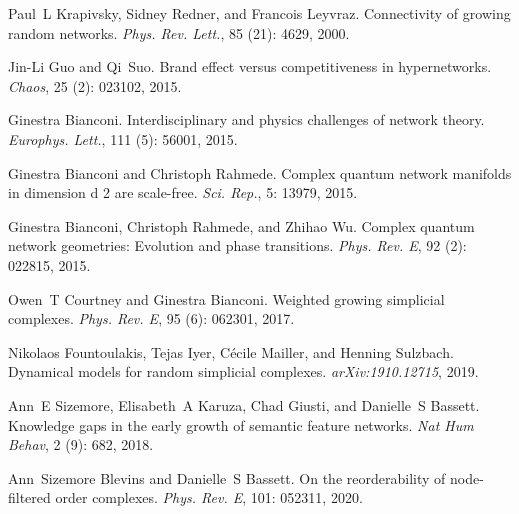 Paul~L Krapivsky, Sidney Redner, and Francois Leyvraz.
\newblock Connectivity of growing random networks.
\newblock \emph{Phys. Rev. Lett.}, 85 (21): 4629, 2000.

Jin-Li Guo and Qi~Suo.
\newblock Brand effect versus competitiveness in hypernetworks.
\newblock \emph{Chaos}, 25 (2): 023102, 2015.

Ginestra Bianconi.
\newblock Interdisciplinary and physics challenges of network theory.
\newblock \emph{Europhys. Lett.}, 111 (5): 56001, 2015.

Ginestra Bianconi and Christoph Rahmede.
\newblock Complex quantum network manifolds in dimension d\textquestiondown{} 2
are scale-free.
\newblock \emph{Sci. Rep.}, 5: 13979, 2015.

Ginestra Bianconi, Christoph Rahmede, and Zhihao Wu.
\newblock Complex quantum network geometries: {{Evolution}} and phase
transitions.
\newblock \emph{Phys. Rev. E}, 92 (2): 022815, 2015.

Owen~T Courtney and Ginestra Bianconi.
\newblock Weighted growing simplicial complexes.
\newblock \emph{Phys. Rev. E}, 95 (6): 062301, 2017.

Nikolaos Fountoulakis, Tejas Iyer, C{\'e}cile Mailler, and Henning Sulzbach.
\newblock Dynamical models for random simplicial complexes.
\newblock \emph{arXiv:1910.12715}, 2019.

Ann~E Sizemore, Elisabeth~A Karuza, Chad Giusti, and Danielle~S Bassett.
\newblock Knowledge gaps in the early growth of semantic feature networks.
\newblock \emph{Nat Hum Behav}, 2 (9): 682,
2018{}.

Ann~Sizemore Blevins and Danielle~S Bassett.
\newblock On the reorderability of node-filtered order complexes.
\newblock \emph{Phys. Rev. E}, 101: 052311, 2020.

